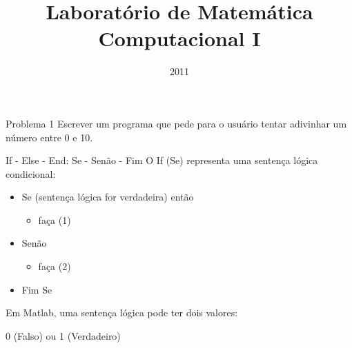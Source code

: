 \documentclass[hyperref={pdfpagelabels=false}]{beamer}
\title{Laboratório de Matemática Computacional I} \author[M. Weber Mendonça]
\institute[UFSC]{\inst{1} Universidade Federal de Santa Catarina}
\date{2011}
\begin{document}
\begin{frame}
  \titlepage
\end{frame}

\begin{frame}{Problema 1}
  Escrever um programa que pede para o usuário tentar adivinhar um número entre 0 e 10.
\end{frame}

\begin{frame}{If - Else - End: Se - Senão - Fim}
  O If (Se) representa uma sentença lógica condicional: 
  \vskip1cm
  \begin{center}
    \begin{minipage}{0.7\textwidth}
      \begin{itemize}
      \item[] Se (sentença lógica for verdadeira) então
	      \begin{itemize}
	      \item[] faça (1)
	      \end{itemize}
      \item[] Senão
	      \begin{itemize}
	      \item[] faça (2) 
	      \end{itemize}
      \item[] Fim Se 
      \end{itemize}
    \end{minipage}
    \vfill
    \begin{minipage}{0.8\textwidth}
      \begin{alertblock}{}
        Em Matlab, uma sentença lógica pode ter dois valores:\\
        \begin{center} 0 (Falso) ou 1 (Verdadeiro)\end{center}
      \end{alertblock}
    \end{minipage}
  \end{center}
\end{frame}
\end{document}
